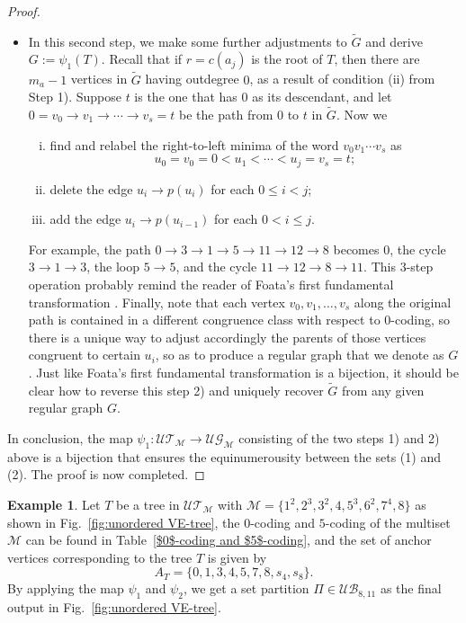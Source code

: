 \documentclass[11pt,reqno]{amsart}
\numberwithin{equation}{section}
\theoremstyle{plain}
\theoremstyle{definition}
\newtheorem{example}[theorem]{Example}
\newcommand{\M}{\mathcal{M}}
\newcommand{\UT}{\mathcal{UT}}
\newcommand{\UB}{\mathcal{UB}}
\newcommand{\UG}{\mathcal{UG}}
\begin{document}
\begin{proof}
\begin{itemize}
	\item[Step 2)] In this second step, we make some further adjustments to $\tilde{G}$ and derive $G:=\psi_1(T)$. Recall that if $r=c(a_j)$ is the root of $T$, then there are $m_a-1$ vertices in $\tilde{G}$ having outdegree $0$, as a result of condition (ii) from Step 1). Suppose $t$ is the one that has $0$ as its descendant, and let $0=v_0\rightarrow v_1\rightarrow\cdots\rightarrow v_s=t$ be the path from $0$ to $t$ in $\tilde{G}$. Now we 
	\begin{enumerate}[i)]
	\item find and relabel the right-to-left minima of the word $v_0v_1\cdots v_s$ as $$u_0=v_0=0<u_1<\cdots<u_j=v_s=t;$$
	\item delete the edge $u_i\rightarrow p(u_i)$ for each $0\le i<j$;
	\item add the edge $u_i\rightarrow p(u_{i-1})$ for each $0<i\le j$. 
	\end{enumerate}
	For example, the path $0\rightarrow 3\rightarrow 1\rightarrow 5\rightarrow 11\rightarrow 12\rightarrow 8$ becomes $0$, the cycle $3\rightarrow 1\rightarrow 3$, the loop $5\rightarrow 5$, and the cycle $11\rightarrow 12\rightarrow 8\rightarrow 11$. This 3-step operation probably remind the reader of Foata's first fundamental transformation \cite[Chap.~10.2]{Lot}. Finally, note that each vertex $v_0,v_1,\ldots,v_s$ along the original path is contained in a different congruence class with respect to $0$-coding, so there is a unique way to adjust accordingly the parents of those vertices congruent to certain $u_i$, so as to produce a regular graph that we denote as $G$. Just like Foata's first fundamental transformation is a bijection, it should be clear how to reverse this step 2) and uniquely recover $\tilde{G}$ from any given regular graph $G$.
\end{itemize}

In conclusion, the map $\psi_1:\UT_{\M}\rightarrow\UG_{\M}$ consisting of the two steps 1) and 2) above is a bijection that ensures the equinumerousity between the sets (1) and (2). The proof is now completed.
\end{proof}

\begin{example}
Let $T$ be a tree in $\UT_{\M}$ with $\M=\{1^2,2^3,3^2,4,5^3,6^2,7^4,8\}$ as shown in Fig.~\ref{fig:unordered VE-tree}, the $0$-coding and $5$-coding of the multiset $\M$ can be found in Table~\ref{$0$-coding and $5$-coding}, and the set of anchor vertices corresponding to the tree $T$ is given by  $$A_T=\{0,1,3,4,5,7,8,s_4,s_8\}.$$
By applying the map $\psi_1$ and $\psi_2$, we get a set partition $\Pi\in\UB_{8,11}$ as the final output in Fig.~\ref{fig:unordered VE-tree}.
\end{example}
\end{document}
